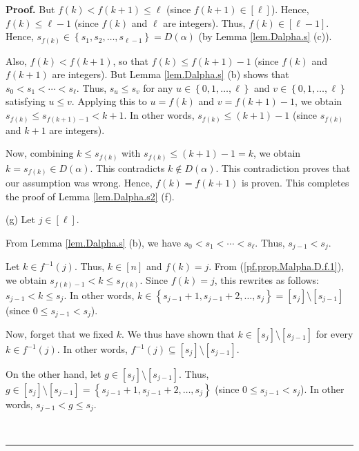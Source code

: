 \documentclass[numbers=enddot,12pt,final,onecolumn,notitlepage,abstracton]{scrartcl}
\theoremstyle{definition}
\newenvironment{proof}[1][Proof]{\noindent\textbf{#1.} }{\ \rule{0.5em}{0.5em}}
\newenvironment{verlong}{}{}
\begin{document}
\begin{verlong}
\begin{footnotesize}
\begin{proof}
But $f\left(  k\right)  <f\left(  k+1\right)  \leq\ell$ (since $f\left(
k+1\right)  \in\left[  \ell\right]  $). Hence, $f\left(  k\right)  \leq\ell-1$
(since $f\left(  k\right)  $ and $\ell$ are integers). Thus, $f\left(
k\right)  \in\left[  \ell-1\right]  $. Hence, $s_{f\left(  k\right)  }%
\in\left\{  s_{1},s_{2},\ldots,s_{\ell-1}\right\}  =D\left(  \alpha\right)  $
(by Lemma \ref{lem.Dalpha.s} (c)).

Also, $f\left(  k\right)  <f\left(  k+1\right)  $, so that $f\left(  k\right)
\leq f\left(  k+1\right)  -1$ (since $f\left(  k\right)  $ and $f\left(
k+1\right)  $ are integers). But Lemma \ref{lem.Dalpha.s} (b) shows that
$s_{0}<s_{1}<\cdots<s_{\ell}$. Thus, $s_{u}\leq s_{v}$ for any $u\in\left\{
0,1,\ldots,\ell\right\}  $ and $v\in\left\{  0,1,\ldots,\ell\right\}  $
satisfying $u\leq v$. Applying this to $u=f\left(  k\right)  $ and $v=f\left(
k+1\right)  -1$, we obtain $s_{f\left(  k\right)  }\leq s_{f\left(
k+1\right)  -1}<k+1$. In other words, $s_{f\left(  k\right)  }\leq\left(
k+1\right)  -1$ (since $s_{f\left(  k\right)  }$ and $k+1$ are integers).

Now, combining $k\leq s_{f\left(  k\right)  }$ with $s_{f\left(  k\right)
}\leq\left(  k+1\right)  -1=k$, we obtain $k=s_{f\left(  k\right)  }\in
D\left(  \alpha\right)  $. This contradicts $k\notin D\left(  \alpha\right)
$. This contradiction proves that our assumption was wrong. Hence, $f\left(
k\right)  =f\left(  k+1\right)  $ is proven. This completes the proof of Lemma
\ref{lem.Dalpha.s2} (f).

(g) Let $j\in\left[  \ell\right]  $.

From Lemma \ref{lem.Dalpha.s} (b), we have $s_{0}<s_{1}<\cdots<s_{\ell}$.
Thus, $s_{j-1}<s_{j}$.

Let $k\in f^{-1}\left(  j\right)  $. Thus, $k\in\left[  n\right]  $ and
$f\left(  k\right)  =j$. From (\ref{pf.prop.Malpha.D.f.1}), we obtain
$s_{f\left(  k\right)  -1}<k\leq s_{f\left(  k\right)  }$. Since $f\left(
k\right)  =j$, this rewrites as follows: $s_{j-1}<k\leq s_{j}$. In other
words, $k\in\left\{  s_{j-1}+1,s_{j-1}+2,\ldots,s_{j}\right\}  =\left[
s_{j}\right]  \setminus\left[  s_{j-1}\right]  $ (since $0\leq s_{j-1}<s_{j}$).

Now, forget that we fixed $k$. We thus have shown that $k\in\left[
s_{j}\right]  \setminus\left[  s_{j-1}\right]  $ for every $k\in f^{-1}\left(
j\right)  $. In other words, $f^{-1}\left(  j\right)  \subseteq\left[
s_{j}\right]  \setminus\left[  s_{j-1}\right]  $.

On the other hand, let $g\in\left[  s_{j}\right]  \setminus\left[
s_{j-1}\right]  $. Thus, $g\in\left[  s_{j}\right]  \setminus\left[
s_{j-1}\right]  =\left\{  s_{j-1}+1,s_{j-1}+2,\ldots,s_{j}\right\}  $ (since
$0\leq s_{j-1}<s_{j}$). In other words, $s_{j-1}<g\leq s_{j}$.


\end{proof}
\end{footnotesize}
\end{verlong}
\end{document}
